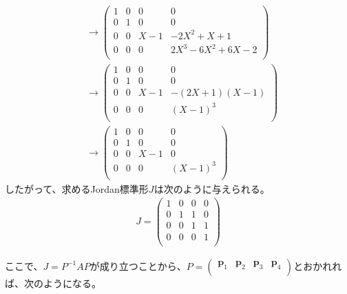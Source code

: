 \documentclass[dvipdfmx]{jsarticle}
\begin{document}
\begin{align*}
&\rightarrow \begin{pmatrix}
1 & 0 & 0 & 0 \\
0 & 1 & 0 & 0 \\
0 & 0 & X - 1 & - 2X^{2} + X + 1 \\
0 & 0 & 0 & 2X^{3} - 6X^{2} + 6X - 2 \\
\end{pmatrix}\\
&\rightarrow \begin{pmatrix}
1 & 0 & 0 & 0 \\
0 & 1 & 0 & 0 \\
0 & 0 & X - 1 & - (2X + 1)(X - 1) \\
0 & 0 & 0 & (X - 1)^{3} \\
\end{pmatrix}\\
&\rightarrow \begin{pmatrix}
1 & 0 & 0 & 0 \\
0 & 1 & 0 & 0 \\
0 & 0 & X - 1 & 0 \\
0 & 0 & 0 & (X - 1)^{3} \\
\end{pmatrix}
\end{align*}
したがって、求めるJordan標準形$J$は次のように与えられる。
\begin{align*}
J = \begin{pmatrix}
1 & 0 & 0 & 0 \\
0 & 1 & 1 & 0 \\
0 & 0 & 1 & 1 \\
0 & 0 & 0 & 1 \\
\end{pmatrix}
\end{align*}\par
ここで、$J = P^{- 1}AP$が成り立つことから、$P = \begin{pmatrix}
\mathbf{p}_{1} & \mathbf{p}_{2} & \mathbf{p}_{3} & \mathbf{p}_{4} \\
\end{pmatrix}$とおかれれば、次のようになる。
\end{document}
